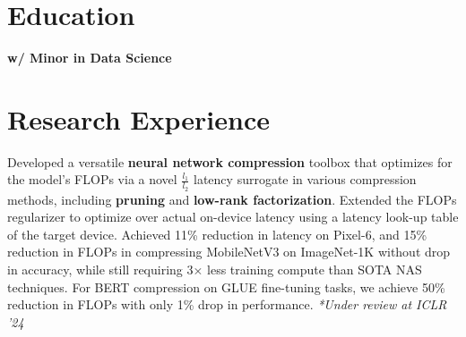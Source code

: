 \documentclass[11pt,a4paper,sans]{moderncv}        %
\begin{document}

\makecvtitle
\vspace{-1.2 cm}
\section{Education}
{}
{}
{\textbf{w/ Minor in Data Science}}
{}
\normalsize

\section{Research Experience}
{Developed a versatile \textbf{neural network compression} toolbox that optimizes for the model's FLOPs via a novel $\frac{l_1}{l_2}$ latency surrogate in various compression methods, including \textbf{pruning} and \textbf{low-rank factorization}. Extended the FLOPs regularizer to optimize over actual on-device latency using a latency look-up table of the target device. Achieved 11\% reduction in latency on Pixel-6, and 15\% reduction in FLOPs in compressing MobileNetV3 on ImageNet-1K without drop in accuracy, while still requiring 3× less training compute than SOTA NAS techniques. For BERT compression on GLUE fine-tuning tasks, we achieve 50\% reduction in FLOPs with only 1\% drop in performance. 
\newline
\scriptsize{\textit{*Under review at ICLR '24}}
}
\end{document}
